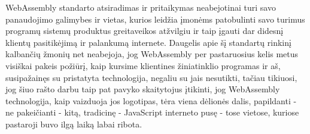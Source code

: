 \documentclass{VUMIFPSkursinis}
\begin{document}
WebAssembly standarto atsiradimas ir pritaikymas neabejotinai turi savo panaudojimo galimybes ir vietas, kurios leidžia įmonėms patobulinti savo turimus programų sistemų produktus greitaveikos atžvilgiu ir taip įgauti dar didesnį klientų pasitikėjimą ir palankumą internete. Daugelis apie šį standartų rinkinį kalbančių žmonių net neabejoja, jog WebAssembly per pastaruosius kelis metus visiškai pakeis požiūrį, kaip kursime klientines žiniatinklio programas ir aš, susipažainęs su pristatyta technologija, negaliu su jais nesutikti, tačiau tikiuosi, jog šiuo rašto darbu taip pat pavyko skaitytojus įtikinti, jog WebAssembly technologija, kaip vaizduoja jos logotipas, tėra viena dėlionės dalis, papildanti - ne pakeičianti - kitą, tradicinę - JavaScript interneto pusę - tose vietose, kuriose pastaroji buvo ilgą laiką labai ribota.
\printbibliography[heading=bibintoc, title=Šaltiniai]  %
\end{document}
